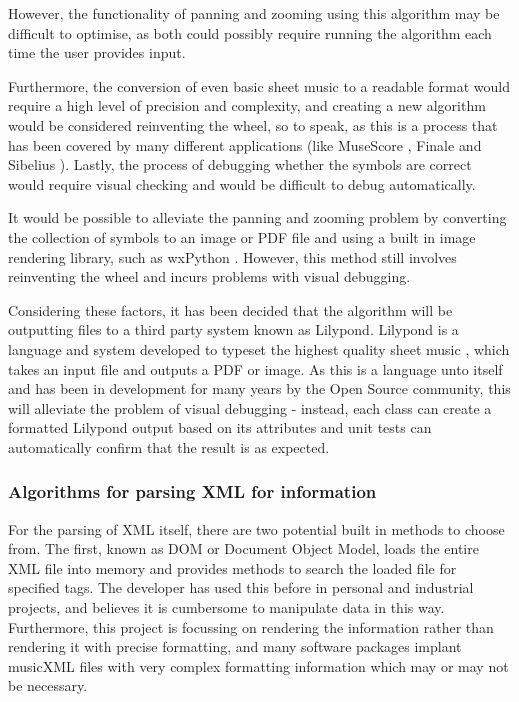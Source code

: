 However, the functionality of panning and zooming using this algorithm may be difficult to optimise, as both could possibly require running the algorithm each time the user provides input. 

Furthermore, the conversion of even basic sheet music to a readable format would require a high level of precision and complexity, and creating a new algorithm would be considered reinventing the wheel, so to speak, as this is a process that has been covered by many different applications (like MuseScore \parencite{MuseTour}, Finale \parencite{mxml} and Sibelius \parencite{avid}). 
Lastly, the process of debugging whether the symbols are correct would require visual checking and would be difficult to debug automatically.

It would be possible to alleviate the panning and zooming problem by converting the collection of symbols to an image or PDF file and using a built in image rendering library, such as wxPython \parencite{WX}. However, this method still involves reinventing the wheel and incurs problems with visual debugging.

Considering these factors, it has been decided that the algorithm will be outputting files to a third party system known as Lilypond. Lilypond is a language and system developed to typeset the highest quality sheet music \parencite{Lilypond}, which takes an input file and outputs a PDF or image. As this is a language unto itself and has been in development for many years by the Open Source community, this will alleviate the problem of visual debugging - instead, each class can create a formatted Lilypond output based on its attributes and unit tests can automatically confirm that the result is as expected.

\subsubsection{Algorithms for parsing XML for information}
For the parsing of XML itself, there are two potential built in methods to choose from. The first, known as DOM or Document Object Model, loads the entire XML file into memory and provides methods to search the loaded file for specified tags. The developer has used this before in personal and industrial projects, and believes it is cumbersome to manipulate data in this way. Furthermore, this project is focussing on rendering the information rather than rendering it with precise formatting, and many software packages implant musicXML files with very complex formatting information which may or may not be necessary\parencite{MusicXMLPresentation}.

